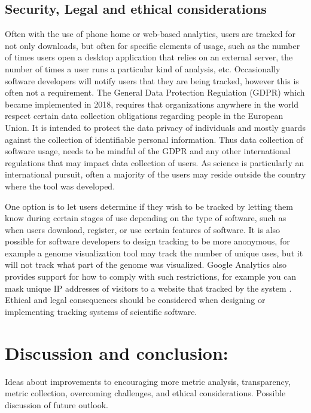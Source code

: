 \documentclass{article}
\begin{document}
\subsection{Security, Legal and ethical considerations}\label{sec:legal_ethics}
Often with the use of phone home or web-based analytics, users are tracked for not only downloads, but often for specific elements of usage, such as the number of times users open a desktop application that relies on an external server, the number of times a user runs a particular kind of analysis, etc. Occasionally software developers will notify users that they are being tracked, however this is often not a requirement. The General Data Protection Regulation (GDPR) which became implemented in 2018, requires that organizations anywhere in the world respect certain data collection obligations regarding people in the European Union. It is intended to protect the data privacy of individuals and mostly guards against the collection of identifiable personal information. Thus data collection of software usage, needs to be mindful of the GDPR and any other international regulations that may impact data collection of users.  As science is particularly an international pursuit, often a majority of the users may reside outside the country where the tool was developed.

One option is to let users determine if they wish to be tracked by letting them know during certain stages of use depending on the type of software, such as when users download, register, or use certain features 
 of software. It is also possible for software developers to design tracking to be more anonymous, for example a genome visualization tool may track the number of unique uses, but it will not track what part of the genome was visualized. Google Analytics also provides support for how to comply with such restrictions, for example you can  mask unique IP addresses of visitors to a website that tracked by the system \cite{google_analytics_privacy}.  Ethical and legal consequences should be considered when designing or implementing tracking systems of scientific software. 



\section{Discussion and conclusion:}
 Ideas about improvements to encouraging more metric analysis, transparency, metric collection, overcoming challenges, and ethical considerations. Possible discussion of future outlook.
\end{document}
